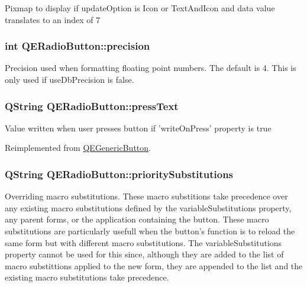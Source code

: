 \label{classQERadioButton_aed4591af2dbf39278086d296f3e8db7e}
Pixmap to display if updateOption is Icon or TextAndIcon and data value translates to an index of 7 \hypertarget{classQERadioButton_a279ecec8126e3a6716e161fc6af9af7c}{
\subsubsection[{precision}]{\setlength{\rightskip}{0pt plus 5cm}int QERadioButton::precision}}
\label{classQERadioButton_a279ecec8126e3a6716e161fc6af9af7c}
Precision used when formatting floating point numbers. The default is 4. This is only used if useDbPrecision is false. \hypertarget{classQERadioButton_a3eda04a8d01c637711866008838ec71e}{
\subsubsection[{pressText}]{\setlength{\rightskip}{0pt plus 5cm}QString QERadioButton::pressText}}
\label{classQERadioButton_a3eda04a8d01c637711866008838ec71e}
Value written when user presses button if 'writeOnPress' property is true 

Reimplemented from \hyperlink{classQEGenericButton}{QEGenericButton}.

\hypertarget{classQERadioButton_a83f29517bee8952e95d85d6ad6ddb89c}{
\subsubsection[{prioritySubstitutions}]{\setlength{\rightskip}{0pt plus 5cm}QString QERadioButton::prioritySubstitutions}}
\label{classQERadioButton_a83f29517bee8952e95d85d6ad6ddb89c}
Overriding macro substitutions. These macro substitions take precedence over any existing macro substitutions defined by the variableSubstitutions property, any parent forms, or the application containing the button. These macro substitutions are particularly usefull when the button's function is to reload the same form but with different macro substitutions. The variableSubstitutions property cannot be used for this since, although they are added to the list of macro substittions applied to the new form, they are appended to the list and the existing macro substitutions take precedence. 

